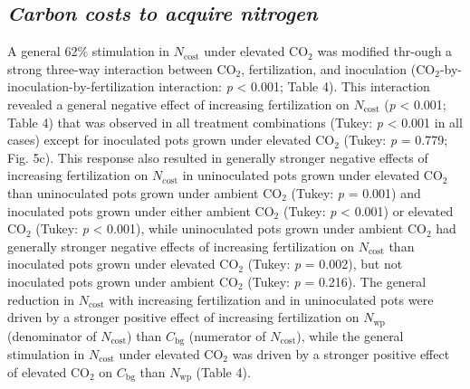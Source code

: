 \subsection{\textit{Carbon costs to acquire nitrogen}}
A general 62\% stimulation in $N_\mathrm{cost}$ under elevated CO$_2$ was modified thr-ough a strong three-way interaction between CO$_2$, fertilization, and inoculation (CO$_2$-by-inoculation-by-fertilization interaction: \textit{p} < 0.001; Table 4). This interaction revealed a general negative effect of increasing fertilization on $N_\mathrm{cost}$ (\textit{p} < 0.001; Table 4) that was observed in all treatment combinations (Tukey: \textit{p} < 0.001 in all cases) except for inoculated pots grown under elevated CO$_2$ (Tukey: \textit{p} = 0.779; Fig. 5c). This response also resulted in generally stronger negative effects of increasing fertilization on $N_\mathrm{cost}$ in uninoculated pots grown under elevated CO$_2$ than uninoculated pots grown under ambient CO$_2$ (Tukey: \textit{p} = 0.001) and inoculated pots grown under either ambient CO$_2$ (Tukey: \textit{p} < 0.001) or elevated CO$_2$ (Tukey: \textit{p} < 0.001), while uninoculated pots grown under ambient CO$_2$ had generally stronger negative effects of increasing fertilization on $N_\mathrm{cost}$ than inoculated pots grown under elevated CO$_2$ (Tukey: \textit{p} = 0.002), but not inoculated pots grown under ambient CO$_2$ (Tukey: \textit{p} = 0.216). The general reduction in $N_\mathrm{cost}$ with increasing fertilization and in uninoculated pots were driven by a stronger positive effect of increasing fertilization on $N_\mathrm{wp}$ (denominator of $N_\mathrm{cost}$) than $C_\mathrm{bg}$ (numerator of $N_\mathrm{cost}$), while the general stimulation in $N_\mathrm{cost}$ under elevated CO$_2$ was driven by a stronger positive effect of elevated CO$_2$ on $C_\mathrm{bg}$ than $N_\mathrm{wp}$ (Table 4).

